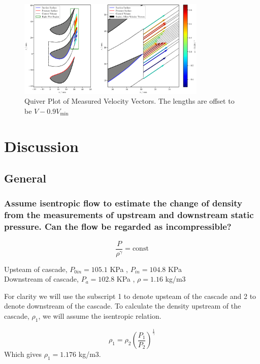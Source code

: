 \documentclass{article}
\begin{document}
\begin{figure}[H]
    \centering
    \includegraphics[width=0.8\textwidth]{figures/quiver_plot.eps}
    \caption{Quiver Plot of Measured Velocity Vectors. The lengths are offset to be $V-0.9V_\text{min}$}
    \label{fig:quiver_plot}
\end{figure}


\section{Discussion}

\subsection{General}

\subsubsection{ Assume isentropic flow to estimate the change of density from the measurements of
upstream and downstream static pressure. Can the flow be regarded as incompressible?}

\begin{equation}
    \frac{P}{\rho^\gamma} = \text{const}
\end{equation}

Upsteam of cascade, $P_{0in} = 105.1$ KPa , $P_{in} = 104.8$ KPa \\
Downstream of cascade,  $P_a = 102.8$ KPa , $\rho = 1.16$ kg/m3

For clarity we will use the subscript 1 to denote upsteam of the cascade and 2 to denote downstream of the cascade.
To calculate the density upstream of the cascade, $\rho_1$, we will assume the isentropic relation.

\begin{equation}
    \rho_1 = \rho_2 \left( \frac{P_1}{P_2} \right)^\frac{1}{\gamma}
\end{equation}
Which gives $\rho_1 = 1.176$ kg/m3.
\end{document}
